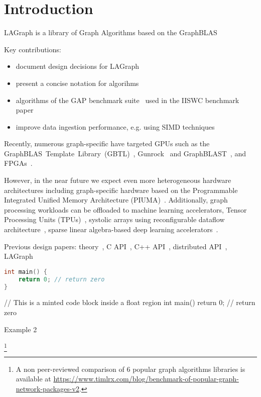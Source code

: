 \section{Introduction}
\label{sec:introduction}

LAGraph is a library of Graph Algorithms based on the GraphBLAS

Key contributions:

\begin{itemize}
    \item document design decisions for LAGraph
    \item present a concise notation for \grb algorihms
    \item algorithms of the GAP benchmark suite~\cite{DBLP:journals/corr/BeamerAP15} used in the IISWC benchmark paper~\cite{DBLP:conf/iiswc/AzadABBCDDDDFGG20}
    \item improve data ingestion performance, e.g. using SIMD techniques~\cite{DBLP:journals/vldb/LangdaleL19}
\end{itemize}

Recently, numerous graph-specific have targeted GPUs such as the \mbox{GraphBLAS Template Library (GBTL)}~\cite{7529957}, Gunrock~\cite{DBLP:journals/topc/WangPDWYWOYLRO17} and \mbox{GraphBLAST}~\cite{DBLP:journals/corr/abs-1908-01407}, and FPGAs~\cite{DBLP:journals/corr/abs-1903-06697}.

However, in the near future we expect even more heterogeneous hardware architectures including graph-specific hardware based on the Programmable Integrated Unified Memory Architecture (PIUMA)~\cite{DBLP:journals/corr/abs-2010-06277}.
Additionally, graph processing workloads can be offloaded to  machine learning accelerators, \eg
Tensor Processing Units (TPUs)~\cite{DBLP:conf/isca/JouppiYPPABBBBB17},
systolic arrays using reconfigurable dataflow architecture~\cite{SambaNova},
sparse linear algebra-based deep learning accelerators~\cite{Cerebras}.

Previous \grb design papers:
theory~\cite{DBLP:conf/hpec/MattsonBBBDFFGGHKLLPPRSWY13},
C API~\cite{DBLP:conf/hpec/MattsonYMBM17},
C++ API~\cite{DBLP:conf/ipps/BrockBMMM20},
distributed API~\cite{DBLP:conf/ipps/BrockBMMMPSS20},
LAGraph~\cite{DBLP:conf/ipps/MattsonDKBMMY19}

\begin{lstlisting}[language=C, label=lst:example, caption=Example]
int main() {
    return 0; // return zero
}
\end{lstlisting}

\begin{listing}[h]
\begin{cplus}
// This is a minted code block inside a float region
int main() {
    return 0; // return zero
}
\end{cplus}
\caption{Example 2}
\end{listing}



\footnote{A non peer-reviewed comparison of 6 popular graph algorithms libraries is available at
\url{https://www.timlrx.com/blog/benchmark-of-popular-graph-network-packages-v2}.}
